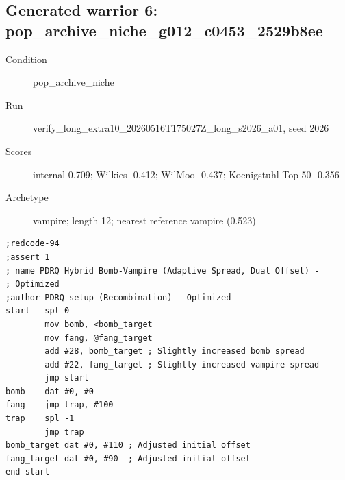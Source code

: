 \subsection*{Generated warrior 6: pop\_archive\_niche\_g012\_c0453\_2529b8ee}
\begin{description}
\item[Condition] pop\_archive\_niche
\item[Run] verify\_long\_extra10\_20260516T175027Z\_long\_s2026\_a01, seed 2026
\item[Scores] internal 0.709; Wilkies -0.412; WilMoo -0.437; Koenigstuhl Top-50 -0.356
\item[Archetype] vampire; length 12; nearest reference vampire (0.523)
\end{description}
\begingroup\small
\begin{verbatim}
;redcode-94
;assert 1
; name PDRQ Hybrid Bomb-Vampire (Adaptive Spread, Dual Offset) -
; Optimized
;author PDRQ setup (Recombination) - Optimized
start   spl 0
        mov bomb, <bomb_target
        mov fang, @fang_target
        add #28, bomb_target ; Slightly increased bomb spread
        add #22, fang_target ; Slightly increased vampire spread
        jmp start
bomb    dat #0, #0
fang    jmp trap, #100
trap    spl -1
        jmp trap
bomb_target dat #0, #110 ; Adjusted initial offset
fang_target dat #0, #90  ; Adjusted initial offset
end start
\end{verbatim}
\endgroup

